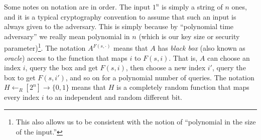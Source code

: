 \hypertarget{prfdef}{}

Some notes on notation are in order. The input \(1^n\) is simply a
string of \(n\) ones, and it is a typical cryptography convention to
assume that such an input is always given to the adversary. This is
simply because by ``polynomial time adversary'' we really mean
polynomial in \(n\) (which is our key size or security
parameter)\footnote{This also allows us to be consistent with the notion
  of ``polynomial in the size of the input.''}. The notation
\(A^{F(s,\cdot)}\) means that \(A\) has \emph{black box} (also known as
\emph{oracle}) access to the function that maps \(i\) to \(F(s,i)\).
That is, \(A\) can choose an index \(i\), query the box and get
\(F(s,i)\), then choose a new index \(i'\), query the box to get
\(F(s,i')\), and so on for a polynomial number of queries. The notation
\(H \leftarrow_R [2^n] \rightarrow \{0,1\}\) means that \(H\) is a
completely random function that maps every index \(i\) to an independent
and random different bit.

